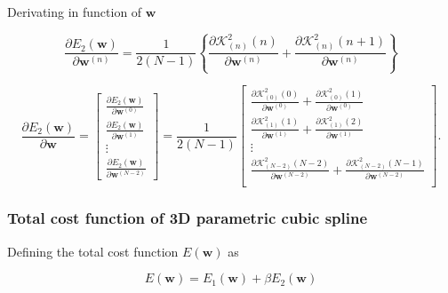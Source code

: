Derivating in function of $\mathbf{w}$

\begin{equation}
\frac{\partial E_{2}(\mathbf{w})}{\partial \mathbf{w}^{(n)}}
=
\frac{1}{2(N-1)}
\left\{
\frac{
\partial 
\mathcal{K}_{(n)}^{2}(n)
}{\partial \mathbf{w}^{(n)}}
+
\frac{
\partial 
\mathcal{K}_{(n)}^{2}(n+1)
}{\partial \mathbf{w}^{(n)}}
\right\}
\end{equation}

\begin{equation}\label{eq:DE2}
\frac{\partial E_{2}(\mathbf{w})}{\partial \mathbf{w}}
=
\begin{bmatrix}
\frac{\partial E_{2}(\mathbf{w})}{\partial \mathbf{w}^{(0)}}\\[4pt]
\frac{\partial E_{2}(\mathbf{w})}{\partial \mathbf{w}^{(1)}}\\[4pt]
\vdots\\[4pt]
\frac{\partial E_{2}(\mathbf{w})}{\partial \mathbf{w}^{(N-2)}}
\end{bmatrix}
=
\frac{1}{2(N-1)}
\begin{bmatrix}
%
\frac{
\partial 
\mathcal{K}_{(0)}^{2}(0)
}{\partial \mathbf{w}^{(0)}}
+
\frac{
\partial 
\mathcal{K}_{(0)}^{2}(1)
}{\partial \mathbf{w}^{(0)}}\\[4pt]
%
\frac{
\partial 
\mathcal{K}_{(1)}^{2}(1)
}{\partial \mathbf{w}^{(1)}}
+
\frac{
\partial 
\mathcal{K}_{(1)}^{2}(2)
}{\partial \mathbf{w}^{(1)}}\\[4pt]
%
\vdots\\[4pt]
\frac{
\partial 
\mathcal{K}_{(N-2)}^{2}(N-2)
}{\partial \mathbf{w}^{(N-2)}}
+
\frac{
\partial 
\mathcal{K}_{(N-2)}^{2}(N-1)
}{\partial \mathbf{w}^{(N-2)}}\\
%
\end{bmatrix}
.
\end{equation}

\subsubsection{Total cost function of 3D parametric cubic spline}
\label{sec:TotalCostFunc}

Defining the total cost function $E(\mathbf{w})$ as

\begin{equation}\label{eq:BasicCost}
E(\mathbf{w})=E_{1}(\mathbf{w})+\beta E_{2}(\mathbf{w})
\end{equation}

